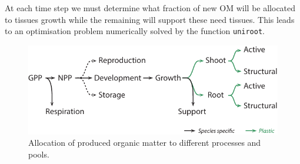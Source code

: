 \documentclass[a4paper,twoside, justified,marginals=raggedright, nobib]{tufte-handout}
\begin{document}
\indent At each time step we must determine what fraction of new OM will be allocated to tissues growth while the remaining will support these need tissues. This leads to an optimisation problem numerically solved by the function \texttt{uniroot}.\\
\begin{figure}
\includegraphics{./Figures/allocation_path_t.pdf}
\caption{Allocation of produced organic matter to different processes and pools.}
\end{figure}
\end{document}
